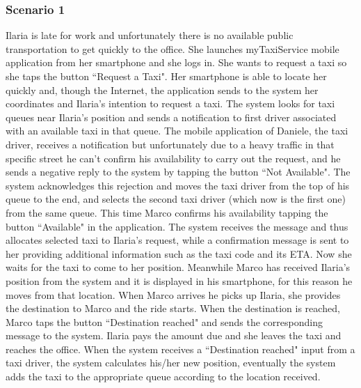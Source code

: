 \documentclass[a4paper,12pt]{article}%
\begin{document}
\subsubsection{Scenario 1}
Ilaria is late for work and unfortunately there is no available public transportation to get quickly to the office. She launches myTaxiService mobile application from her smartphone and she logs in.
She wants to request a taxi so she taps the button ``Request a Taxi".
Her smartphone is able to locate her quickly and, though the Internet, the application sends to the system her coordinates and Ilaria's intention to request a taxi. The system looks for taxi queues near Ilaria's position and sends a notification to first driver associated with an available taxi in that queue.
The mobile application of Daniele, the taxi driver, receives a notification but unfortunately due to a heavy traffic in that specific street he can't confirm his availability to carry out the request, and he sends a negative reply to the system by tapping the button ``Not Available".
The system acknowledges this rejection and moves the taxi driver from the top of his queue to the end, and selects the second taxi driver (which now is the first one) from the same queue.
This time Marco confirms his availability tapping the button ``Available" in the application. The system receives the message and thus allocates selected taxi to Ilaria's request, while a confirmation message is sent to her providing additional information such as the taxi code and its ETA. Now she waits for the taxi to come to her position.
Meanwhile Marco has received Ilaria's position from the system and it is displayed in his smartphone, for this reason he moves from that location.
When Marco arrives he picks up Ilaria, she provides the destination to Marco and the ride starts.
When the destination is reached, Marco taps the button ``Destination reached" and sends the corresponding message to the system. Ilaria pays the amount due and she leaves the taxi and reaches the office. When the system receives a ``Destination reached" input from a taxi driver, the system calculates his/her new position, eventually the system adds the taxi to the appropriate queue according to the location received.
\end{document}
